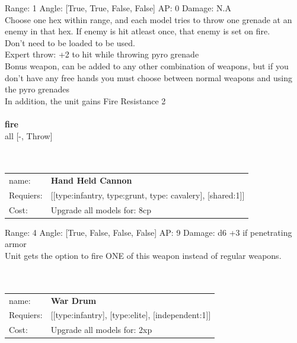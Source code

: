Range: 1  Angle: [True, True, False, False] AP: 0 Damage: N.A \\
Choose one hex within range, and each model tries to throw one grenade at an enemy in that hex. If enemy is hit atleast once, that enemy is set on fire.\\ 
Don't need to be loaded to be used.\\ 
Expert throw: +2 to hit while throwing pyro grenade\\ 
Bonus weapon, can be added to any other combination of weapons, but if you don't have any free hands you must choose between normal weapons and using the pyro grenades\\ 
In addition, the unit gains Fire Resistance 2\\ 







\ \\ {\bf fire } \\
all [-, Throw] \\

\ \\
\ \\
\begin{tabular}{ll}
name: & {\bf Hand Held Cannon } \\
Requiers: & [[type:infantry, type:grunt, type: cavalery], [shared:1]] \\
Cost: & Upgrade all models for: 8cp \\
\end{tabular}



Range: 4  Angle: [True, False, False, False] AP: 9 Damage: d6 +3 if penetrating armor \\
Unit gets the option to fire ONE of this weapon instead of regular weapons.\\ 








\ \\
\ \\
\begin{tabular}{ll}
name: & {\bf War Drum } \\
Requiers: & [[type:infantry], [type:elite], [independent:1]] \\
Cost: & Upgrade all models for: 2xp \\
\end{tabular}

